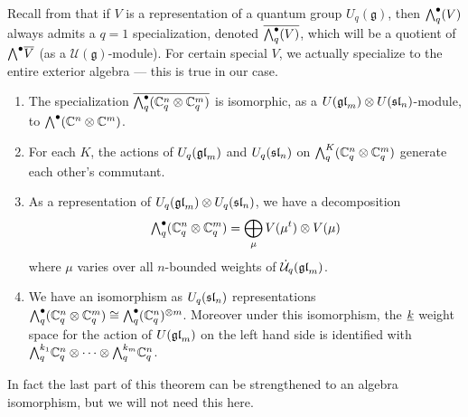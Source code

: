 \documentclass[11pt]{amsart}
\begin{document}
Recall from \cite{BZ} that if $ V $ is a representation of a quantum group $ U_q(\mathfrak{g}) $, then $ \Alt{\bullet}{q}(V) $ always admits a $ q=1 $ specialization, denoted $ \overline{\Alt{\bullet}{q}(V)}$, which will be a quotient of $ \Alt{\bullet}{} \overline{V} $ (as a $\mathcal{U}(\mathfrak{g})$-module). For certain special $ V $, we actually specialize to the entire exterior algebra --- this is true in our case.

\begin{thm} \label{th:qSkewHowe}\mbox{}
\begin{enumerate}
\item The specialization $\overline{\Alt{\bullet}{q}(\bC_q^n \otimes \bC_q^m)} $ is isomorphic, as a $U(\gl_m) \otimes U(\sl_n)$-module, to $ \Alt{\bullet}{}(\bC^n \otimes \bC^m) $.
\item For each $ K $, the actions of $ U_q(\gl_m) $ and $ U_q(\sl_n) $ on $ \Alt{K}{q}(\bC_q^n \otimes \bC_q^m) $ generate each other's commutant.
\item As a representation of $ U_q(\gl_m) \otimes U_q(\sl_n)  $, we have a decomposition
$$ \Alt{\bullet}{q} (\mathbb C^n_q \otimes \mathbb C^m_q) = \bigoplus_{\mu} V(\mu^t) \otimes V(\mu) $$
 where $\mu$ varies over all $n$-bounded weights of $ \dU(\gl_m)$.
\item We have an isomorphism as $ U_q(\sl_n) $ representations 
$ \Alt{\bullet}{q}(\mathbb C^n_q \otimes \mathbb C^m_q) \cong \Alt{\bullet}{q}(\bC_q^n)^{\otimes m} $.  Moreover under this isomorphism, the $ \ul{k} $ weight space for the action of $ U(\gl_m) $ on the left hand side is identified with $\Alt{k_1}{q} \mathbb C_q^n \otimes \cdots \otimes \Alt{k_m}{q} \mathbb C_q^n$.
\end{enumerate}
\end{thm}

In fact the last part of this theorem can be strengthened to an algebra isomorphism, but we will not need this here.
\end{document}
